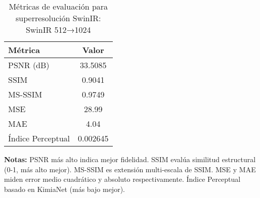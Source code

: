 \begin{table}[!htb]
\centering
\caption{Métricas de evaluación para superresolución SwinIR: SwinIR 512→1024}
\label{tab:swinir_metrics_swinir_512→1024}
\begin{tabular}{|l|c|}
\hline
\textbf{Métrica} & \textbf{Valor} \\
\hline
PSNR (dB) & 33.5085 \\
SSIM & 0.9041 \\
MS-SSIM & 0.9749 \\
MSE & 28.99 \\
MAE & 4.04 \\
Índice Perceptual & 0.002645 \\
\hline
\end{tabular}
\textbf{Notas:} PSNR más alto indica mejor fidelidad. SSIM evalúa similitud estructural (0-1, más alto mejor). MS-SSIM es extensión multi-escala de SSIM. MSE y MAE miden error medio cuadrático y absoluto respectivamente. Índice Perceptual basado en KimiaNet (más bajo mejor).
\end{table}
